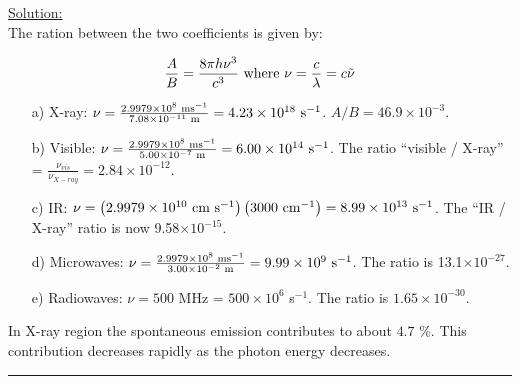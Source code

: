 \noindent
\underline{Solution:}\\

\noindent
The ration between the two coefficients is given by:

$$\frac{A}{B} = \frac{8\pi h\nu^3}{c^3}\textnormal{ where }\nu = \frac{c}{\lambda} = c\tilde{\nu}$$

\begin{itemize}

\item[a)] X-ray: $\nu = \frac{2.9979\times 10^8\textnormal{ ms}^{-1}}{7.08\times 10^{-11}\textnormal{ m}} = 4.23\times 10^{18}\textnormal{ s}^{-1}$. $A/B = 46.9\times 10^{-3}$.

\item[b)] Visible: $\nu = \frac{2.9979\times 10^8\textnormal{ ms}^{-1}}{5.00\times10^{-7}\textnormal{ m}} = 6.00\times10^{14}\textnormal{ s}^{-1}$. The ratio ``visible / X-ray'' = $\frac{\nu_{vis}}{\nu_{X-ray}} = 2.84\times 10^{-12}$.

\item[c)] IR: $\nu = \left(2.9979\times 10^{10}\textnormal{ cm s}^{-1}\right)\left(3000\textnormal{ cm}^{-1}\right) = 8.99\times 10^{13}\textnormal{ s}^{-1}$. The ``IR / X-ray'' ratio is now 9.58$\times 10^{-15}$.

\item[d)] Microwaves: $\nu = \frac{2.9979\times 10^8\textnormal{ ms}^{-1}}{3.00\times 10^{-2}\textnormal{ m}} = 9.99\times 10^9\textnormal{ s}^{-1}$. The ratio is 13.1$\times 10^{-27}$.

\item[e)] Radiowaves: $\nu = 500$ MHz = $500\times 10^6$ s$^{-1}$. The ratio is $1.65\times 10^{-30}$.

\end{itemize}

\noindent
In X-ray region the spontaneous emission contributes to about $4.7$ \%. This contribution decreases rapidly as the photon energy decreases.

\hrule\vspace{0.5cm}



